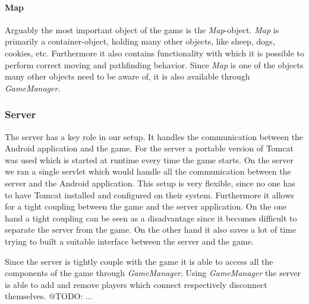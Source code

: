 \documentclass[a4paper,10pt]{report}
\begin{document}
		\paragraph{Map}
		Arguably the most important object of the game is the \emph{Map}-object.
		\emph{Map} is primarily a container-object, holding many other objects, like sheep, dogs, cookies, etc.
		Furthermore it also contains functionality with which it is possible to perform correct moving and pathfinding behavior.
		Since \emph{Map} is one of the objects many other objects need to be aware of, it is also available through \emph{GameManager}.		


	\subsubsection{Server}
	The server has a key role in our setup.
	It handles the communication between the Android application and the game.
	For the server a portable version of Tomcat was used which is started at runtime every time the game starts.
	On the server we ran a single servlet which would handle all the communication between the server and the Android application.
	This setup is very flexible, since no one has to have Tomcat installed and configured on their system.
	Furthermore it allows for a tight coupling between the game and the server application.
	On the one hand a tight coupling can be seen as a disadvantage since it becomes difficult to separate the server from the game.
	On the other hand it also saves a lot of time trying to built a suitable interface between the server and the game.
			
	Since the server is tightly couple with the game it is able to access all the components of the game through \emph{GameManager}.
	Using \emph{GameManager} the server is able to add and remove players which connect respectively disconnect themselves.
	@TODO: ... 
	
\end{document}
